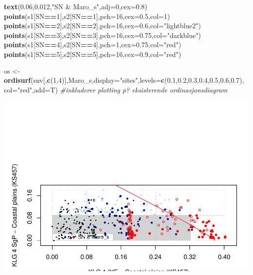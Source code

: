 \documentclass[]{article}
\newenvironment{Shaded}{\begin{snugshade}}{\end{snugshade}}
\newcommand{\CommentTok}[1]{\textcolor[rgb]{0.56,0.35,0.01}{\textit{#1}}}
\newcommand{\DataTypeTok}[1]{\textcolor[rgb]{0.13,0.29,0.53}{#1}}
\newcommand{\DecValTok}[1]{\textcolor[rgb]{0.00,0.00,0.81}{#1}}
\newcommand{\FloatTok}[1]{\textcolor[rgb]{0.00,0.00,0.81}{#1}}
\newcommand{\KeywordTok}[1]{\textcolor[rgb]{0.13,0.29,0.53}{\textbf{#1}}}
\newcommand{\NormalTok}[1]{#1}
\newcommand{\OperatorTok}[1]{\textcolor[rgb]{0.81,0.36,0.00}{\textbf{#1}}}
\newcommand{\StringTok}[1]{\textcolor[rgb]{0.31,0.60,0.02}{#1}}
\begin{document}
\begin{Shaded}
\begin{Highlighting}[]
\KeywordTok{text}\NormalTok{(}\FloatTok{0.06}\NormalTok{,}\FloatTok{0.012}\NormalTok{,}\StringTok{"SN & Maro_s"}\NormalTok{,}\DataTypeTok{adj=}\DecValTok{0}\NormalTok{,}\DataTypeTok{cex=}\FloatTok{0.8}\NormalTok{)}
\KeywordTok{points}\NormalTok{(s1[SN}\OperatorTok{==}\DecValTok{1}\NormalTok{],s2[SN}\OperatorTok{==}\DecValTok{1}\NormalTok{],}\DataTypeTok{pch=}\DecValTok{16}\NormalTok{,}\DataTypeTok{cex=}\FloatTok{0.5}\NormalTok{,}\DataTypeTok{col=}\DecValTok{1}\NormalTok{)}
\KeywordTok{points}\NormalTok{(s1[SN}\OperatorTok{==}\DecValTok{2}\NormalTok{],s2[SN}\OperatorTok{==}\DecValTok{2}\NormalTok{],}\DataTypeTok{pch=}\DecValTok{16}\NormalTok{,}\DataTypeTok{cex=}\FloatTok{0.6}\NormalTok{,}\DataTypeTok{col=}\StringTok{"lightblue2"}\NormalTok{)}
\KeywordTok{points}\NormalTok{(s1[SN}\OperatorTok{==}\DecValTok{3}\NormalTok{],s2[SN}\OperatorTok{==}\DecValTok{3}\NormalTok{],}\DataTypeTok{pch=}\DecValTok{16}\NormalTok{,}\DataTypeTok{cex=}\FloatTok{0.75}\NormalTok{,}\DataTypeTok{col=}\StringTok{"darkblue"}\NormalTok{)}
\KeywordTok{points}\NormalTok{(s1[SN}\OperatorTok{==}\DecValTok{4}\NormalTok{],s2[SN}\OperatorTok{==}\DecValTok{4}\NormalTok{],}\DataTypeTok{pch=}\DecValTok{1}\NormalTok{,}\DataTypeTok{cex=}\FloatTok{0.75}\NormalTok{,}\DataTypeTok{col=}\StringTok{"red"}\NormalTok{)}
\KeywordTok{points}\NormalTok{(s1[SN}\OperatorTok{==}\DecValTok{5}\NormalTok{],s2[SN}\OperatorTok{==}\DecValTok{5}\NormalTok{],}\DataTypeTok{pch=}\DecValTok{16}\NormalTok{,}\DataTypeTok{cex=}\FloatTok{0.9}\NormalTok{,}\DataTypeTok{col=}\StringTok{"red"}\NormalTok{)}

\NormalTok{os <-}\StringTok{ }\KeywordTok{ordisurf}\NormalTok{(snv[,}\KeywordTok{c}\NormalTok{(}\DecValTok{1}\NormalTok{,}\DecValTok{4}\NormalTok{)],Maro_s,}\DataTypeTok{display=}\StringTok{"sites"}\NormalTok{,}\DataTypeTok{levels=}\KeywordTok{c}\NormalTok{(}\FloatTok{0.1}\NormalTok{,}\FloatTok{0.2}\NormalTok{,}\FloatTok{0.3}\NormalTok{,}\FloatTok{0.4}\NormalTok{,}\FloatTok{0.5}\NormalTok{,}\FloatTok{0.6}\NormalTok{,}\FloatTok{0.7}\NormalTok{), }\DataTypeTok{col=}\StringTok{"red"}\NormalTok{,}\DataTypeTok{add=}\NormalTok{T) }\CommentTok{#inkluderer plotting p? eksisterende ordinasjonsdiagram}
\end{Highlighting}
\end{Shaded}

\includegraphics{Landscape_analysis_example_4_files/figure-latex/unnamed-chunk-51-1.pdf}
\end{document}
